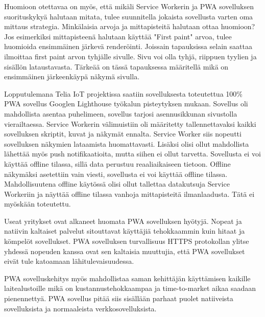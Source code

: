 \documentclass{tktltiki}
\begin{document}
Huomioon otettavaa on myös, että mikäli Service Workerin ja PWA sovelluksen suorituskykyä halutaan mitata, tulee suunnitella jokaista sovellusta varten oma mittaus strategia. Minkälaisia arvoja ja mittapisteitä halutaan ottaa huomioon? Jos esimerkiksi mittapisteenä halutaan käyttää "First paint" arvoa, tulee huomioida ensimmäinen järkevä renderöinti. Joissain tapauksissa selain saattaa ilmoittaa first paint arvon tyhjälle sivulle. Sivu voi olla tyhjä, riippuen tyylien ja sisällön lataustavasta. Tärkeää on tässä tapauksessa määritellä mikä on ensimmäinen järkeenkäypä näkymä sivulla.  

Lopputulemana Telia IoT projektissa saatiin sovelluksesta toteutettua 100\% PWA sovellus Googlen Lighthouse työkalun pisteytyksen mukaan. Sovellus oli mahdollista asentaa puhelimeen, sovellus tarjosi asennusikkunan sivustolla vierailtaessa. Service Workerin välimuistiin oli määritetty tallennettavaksi kaikki sovelluksen skriptit, kuvat ja näkymät ennalta. Service Worker siis nopeutti sovelluksen näkymien lataamista huomattavasti. Lisäksi olisi ollut mahdollista lähettää myös push notifikaatioita, mutta siihen ei ollut tarvetta. Sovellusta ei voi käyttää offline tilassa, sillä data perustuu reaaliaikaiseen tietoon. Offline näkymäksi asetettiin vain viesti, sovellusta ei voi käyttää offline tilassa. Mahdollisuutena offline käytössä olisi ollut tallettaa datakutsuja Service Workeriin ja näyttää offline tilassa vanhoja mittapisteitä ilmanlaadusta. Tätä ei myöskään toteutettu.

Useat yritykset ovat alkaneet huomata PWA sovelluksen hyötyjä. Nopeat ja natiivin kaltaiset palvelut sitouttavat käyttäjiä tehokkaammin kuin hitaat ja kömpelöt sovellukset. PWA sovelluksen turvallisuus HTTPS protokollan ylitse yhdessä nopeuden kanssa ovat sen kaltaisia muuttujia, että PWA sovellukset eivät tule katoamaan lähitulevaisuudessa. \cite{8441701} 

PWA sovelluskehitys myös mahdollistaa saman kehittäjän käyttämisen kaikille laitealustoille mikä on kustannustehokkaampaa ja time-to-market aikaa saadaan pienennettyä. PWA sovellus pitää siis sisällään parhaat puolet natiiveista sovelluksista ja normaaleista verkkosovelluksista. 
\end{document}
